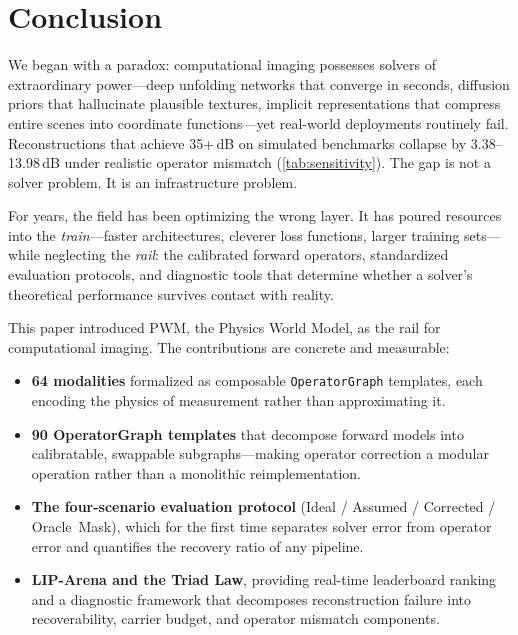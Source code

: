 
\section{Conclusion}
\label{sec:conclusion}

We began with a paradox: computational imaging possesses solvers of
extraordinary power---deep unfolding networks that converge in seconds,
diffusion priors that hallucinate plausible textures, implicit
representations that compress entire scenes into coordinate
functions---yet real-world deployments routinely fail.  Reconstructions
that achieve 35+\,dB on simulated benchmarks collapse by 3.38--13.98\,dB under
realistic operator mismatch (\cref{tab:sensitivity}).  The gap is not a solver problem.
It is an infrastructure problem.

For years, the field has been optimizing the wrong layer.  It has
poured resources into the \emph{train}---faster architectures, cleverer
loss functions, larger training sets---while neglecting the
\emph{rail}: the calibrated forward operators, standardized evaluation
protocols, and diagnostic tools that determine whether a solver's
theoretical performance survives contact with reality.

This paper introduced PWM, the Physics World Model, as the rail for
computational imaging.  The contributions are concrete and measurable:

\begin{itemize}
  \item \textbf{64 modalities} formalized as composable
        \texttt{OperatorGraph} templates, each encoding the physics of
        measurement rather than approximating it.
  \item \textbf{90 OperatorGraph templates} that decompose forward models
        into calibratable, swappable subgraphs---making operator
        correction a modular operation rather than a monolithic
        reimplementation.
  \item \textbf{The four-scenario evaluation protocol}
        (Ideal / Assumed / Corrected / Oracle~Mask), which for the first
        time separates solver error from operator error and quantifies
        the recovery ratio of any pipeline.
  \item \textbf{LIP-Arena and the Triad Law}, providing real-time
        leaderboard ranking and a diagnostic framework that decomposes
        reconstruction failure into recoverability, carrier budget, and
        operator mismatch components.
\end{itemize}

